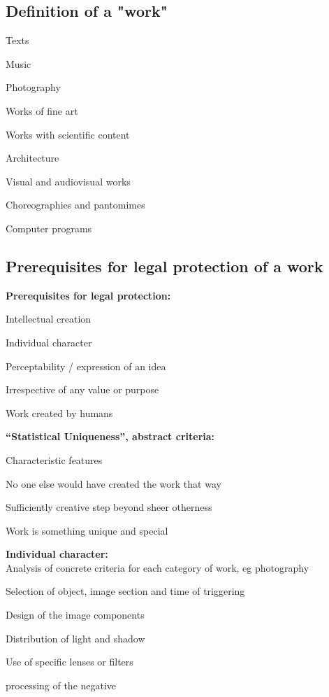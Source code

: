 \subsection{Definition of a "work"}
\begin{compactitem}
	\item Texts
	\item Music
	\item Photography
	\item Works of fine art
	\item Works with scientific content
	\item Architecture
	\item Visual and audiovisual works
	\item Choreographies and pantomimes
	\item Computer programs
\end{compactitem}

\subsection{Prerequisites for legal protection of a work}
\textbf{Prerequisites for legal protection:}
\begin{compactitem}
	\item Intellectual creation
	\item Individual character
	\item Perceptability / expression of an idea
	\item Irrespective of any value or purpose
	\item Work created by humans
\end{compactitem}
\textbf{“Statistical Uniqueness”, abstract criteria:}
\begin{compactitem}
	\item Characteristic features
	\item No one else would have created the work that way
	\item Sufficiently creative step beyond sheer otherness
	\item Work is something unique and special
\end{compactitem}
\textbf{Individual character:} \\
Analysis of concrete criteria for each category of work, eg photography
\begin{compactitem}
	\item Selection of object, image section and time of triggering
	\item Design of the image components
	\item Distribution of light and shadow
	\item Use of specific lenses or filters
	\item processing of the negative
\end{compactitem}

